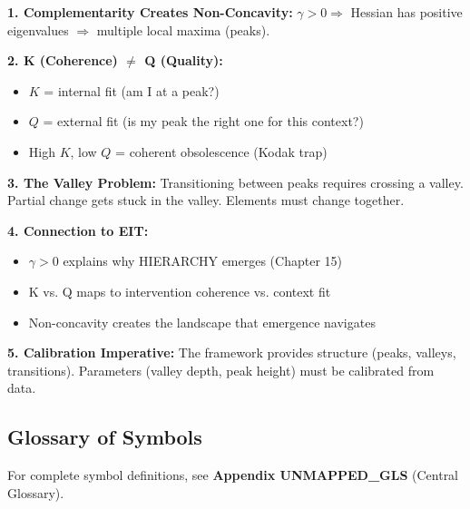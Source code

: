 \begin{tcolorbox}[colback=gray!10!white, colframe=gray!75!black,
    title=\textbf{Summary: Non-Concavity and Fit}]

\textbf{1. Complementarity Creates Non-Concavity:}
$\gamma > 0 \Rightarrow$ Hessian has positive eigenvalues $\Rightarrow$ multiple local maxima (peaks).

\textbf{2. K (Coherence) $\neq$ Q (Quality):}
\begin{itemize}[nosep]
\item $K$ = internal fit (am I at a peak?)
\item $Q$ = external fit (is my peak the right one for this context?)
\item High $K$, low $Q$ = coherent obsolescence (Kodak trap)
\end{itemize}

\textbf{3. The Valley Problem:}
Transitioning between peaks requires crossing a valley. Partial change gets stuck in the valley. Elements must change together.

\textbf{4. Connection to EIT:}
\begin{itemize}[nosep]
\item $\gamma > 0$ explains why HIERARCHY emerges (Chapter 15)
\item K vs. Q maps to intervention coherence vs. context fit
\item Non-concavity creates the landscape that emergence navigates
\end{itemize}

\textbf{5. Calibration Imperative:}
The framework provides structure (peaks, valleys, transitions). Parameters (valley depth, peak height) must be calibrated from data.

\end{tcolorbox}


\subsection{Glossary of Symbols}

For complete symbol definitions, see \textbf{Appendix UNMAPPED_GLS} (Central Glossary).

